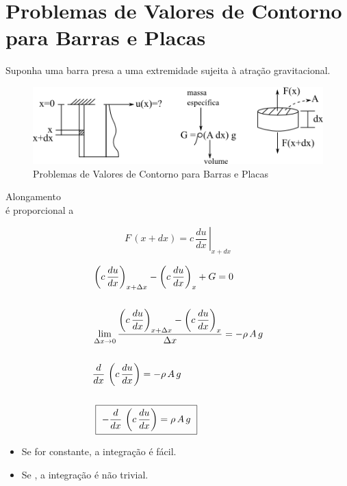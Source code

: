 \section{Problemas de Valores de Contorno para Barras e Placas}

Suponha uma barra presa a uma extremidade sujeita à atração gravitacional.

\begin{figure}[htb]
 \centering
 \includegraphics[scale=1.0]{capitulos/capitulo7/figuras/prob_val_cont_barras_placas1.png}
 \caption{Problemas de Valores de Contorno para Barras e Placas}
 \label{fig:prob_val_cont_barras_placas1}
\end{figure}

Alongamento  \\

 é proporcional a 

\[
 F\,(x + dx) = c \, \left. \frac{du}{dx} \, \right|_{x + dx}
\]

\begin{eqnarray}
 & \left(
  c \, \displaystyle \frac{du}{dx}
 \right)_{x + \Delta x}
 -
 \left(
  c \, \displaystyle \frac{du}{dx}
 \right)_x
 + G = 0 \nonumber \\
 \nonumber \\
 & \lim_{\Delta x \to 0}
 \displaystyle \frac{
  \left(
   c \, \displaystyle \frac{du}{dx}
  \right)_{x + \Delta x}
  -
  \left(
   c \, \displaystyle \frac{du}{dx}
  \right)_x
 }{\Delta x}
 = -\rho \, A \, g \nonumber \\
 \nonumber \\
 & \displaystyle\frac{d}{dx} \, \left( c \, \frac{du}{dx} \right) = -\rho \, A \, g \nonumber \\
 \nonumber \\
 \label{cap7:sec1:eq1}
 & \mbox{ \framebox{ $ \displaystyle -\frac{d}{dx} \, \left( c \, \frac{du}{dx} \right) = \rho \, A \, g $ } }
\end{eqnarray}

\begin{itemize}

\item Se  for constante, a integração é fácil.

\item Se , a integração é não trivial.

\end{itemize}
